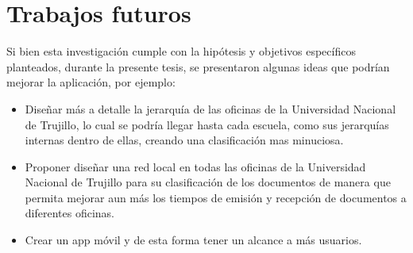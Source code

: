 \section{Trabajos futuros}

Si bien esta investigación cumple con la hipótesis y objetivos específicos planteados, durante la presente tesis, se presentaron algunas ideas que podrían mejorar la aplicación, por ejemplo:

\begin{itemize}
\item Diseñar más a detalle la jerarquía de las oficinas de la Universidad Nacional de Trujillo, lo cual se podría llegar hasta cada escuela, como sus jerarquías internas dentro de ellas, creando una clasificación mas minuciosa.
\item Proponer diseñar una red local en todas las oficinas de la Universidad Nacional de Trujillo para su clasificación de los documentos de manera que permita mejorar  aun más los tiempos de emisión y recepción de documentos a diferentes oficinas.
\item Crear un app móvil y de esta forma tener un alcance a más usuarios.
\end{itemize}



\cleardoublepage
\renewcommand\bibname{Referencias bibliográficas}

